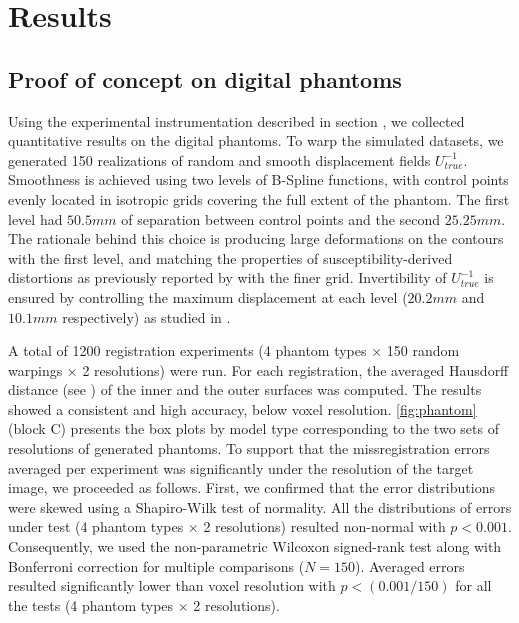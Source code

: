 \section*{Results}
\label{sec:results}

\subsection*{Proof of concept on digital phantoms}
\label{sec:results_phantom}
Using the experimental instrumentation described in section ,
  we collected quantitative results on the digital phantoms.
To warp the simulated datasets, we generated 150 realizations of random and smooth displacement
  fields $U^{-1}_{true}$.
Smoothness is achieved using two levels of B-Spline functions, with control points evenly
  located in isotropic grids covering the full extent of the phantom.
The first level had $50.5mm$ of separation between control points and the second $25.25mm$.
The rationale behind this choice is producing large deformations on the contours with
  the first level, and matching the properties of susceptibility-derived distortions
  as previously reported by \cite{irfanoglu_susceptibility_2011} with the finer grid.
Invertibility of $U^{-1}_{true}$ is ensured by controlling the maximum displacement at each
  level ($20.2mm$ and $10.1mm$ respectively) as studied in \citep{rueckert_diffeomorphic_2006}.

A total of 1200 registration experiments (4 phantom types $\times$ 150 random warpings
  $\times$ 2 resolutions) were run.
For each registration, the averaged Hausdorff distance (see )
  of the inner and the outer surfaces was computed.
The results showed a consistent and high accuracy, below voxel resolution.
\autoref{fig:phantom} (block C) presents the box plots by model type corresponding
  to the two sets of resolutions of generated phantoms.
To support that the missregistration errors averaged per experiment was significantly
  under the resolution of the target image, we proceeded as follows.
First, we confirmed that the error distributions were skewed using a Shapiro-Wilk test of
  normality.
All the distributions of errors under test (4 phantom types $\times$ 2 resolutions) resulted
  non-normal with $p<0.001$.
Consequently, we used the non-parametric Wilcoxon signed-rank test along with Bonferroni
  correction for multiple comparisons ($N=150$).
Averaged errors resulted significantly lower than voxel resolution with $p < (0.001 / 150)$
  for all the tests (4 phantom types $\times$ 2 resolutions).

